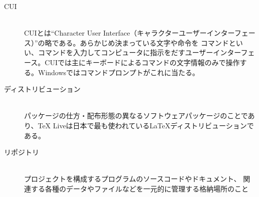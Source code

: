 \documentclass[titlepage]{ltjsarticle}
\begin{document}
\begin{description}
        \item[CUI]~\\
        CUIとは``Character User Interface（キャラクターユーザーインターフェース）''の略である。あらかじめ決まっている文字や命令を コマンドといい、コマンドを入力してコンピュータに指示をだすユーザーインターフェース。CUIでは主にキーボードによるコマンドの文字情報のみで操作する。Windowsではコマンドプロンプトがこれに当たる。
        \item[ディストリビューション]~\\
        パッケージの仕方・配布形態の異なるソフトウェアパッケージのことであり、TeX Liveは日本で最も使われているLaTeXディストリビューションである。


  \item [リポジトリ] ~\\
        プロジェクトを構成するプログラムのソースコードやドキュメント、
        関連する各種のデータやファイルなどを一元的に管理する格納場所のこと
\end{description}
\end{document}
